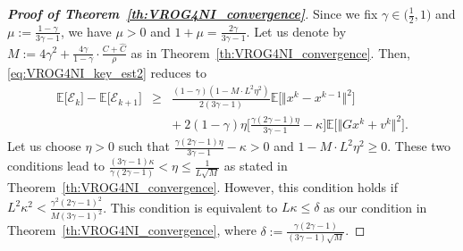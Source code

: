 \documentclass{article}
\newcommand{\norms}[1]{\Vert#1\Vert}
\newcommand{\Expk}[1]{\mathbb{E}\big[#1\big]}
\newcommand{\Ec}{\mathcal{E}}
\theoremstyle{plain}
\theoremstyle{definition}
\theoremstyle{remark}
\begin{document}
\begin{proof}[\textbf{Proof of Theorem~\ref{th:VROG4NI_convergence}}]
Since we fix $\gamma \in \big(\frac{1}{2}, 1\big)$ and $\mu := \frac{1-\gamma}{3\gamma-1}$, we have $\mu > 0$ and $1 + \mu = \frac{2\gamma}{3\gamma-1}$.
Let us denote by $M := 4\gamma^2 + \frac{ 4\gamma}{ 1-\gamma } \cdot \frac{C + \hat{C}}{\rho} $ as in Theorem~\ref{th:VROG4NI_convergence}.
Then, \eqref{eq:VROG4NI_key_est2} reduces to
\begin{equation}\label{eq:VROG4NI_key_est2_proof}
\begin{array}{lcl}
\Expk{ \Ec_k } - \Expk{ \Ec_{k+1} }  & \geq &  \frac{(1 - \gamma)(1 -  M \cdot L^2\eta^2 )}{2(3\gamma-1)} \Expk{ \norms{x^k - x^{k-1}}^2 } \\
&& + {~} 2(1-\gamma)\eta \big[  \frac{\gamma(2\gamma - 1)\eta}{3\gamma-1} - \kappa \big]  \Expk{ \norms{Gx^k + v^k}^2 }.
\end{array}
\end{equation}
Let us choose $\eta > 0$ such that $\frac{\gamma(2\gamma - 1)\eta}{3\gamma-1} - \kappa > 0$ and $1 -  M \cdot L^2\eta^2 \geq 0$.
These two conditions lead to $\frac{(3\gamma-1)\kappa}{\gamma(2\gamma-1)} < \eta \leq \frac{1}{L\sqrt{M}}$ as stated in Theorem~\ref{th:VROG4NI_convergence}. 
However, this condition holds if $L^2\kappa^2 < \frac{\gamma^2(2\gamma-1)^2}{M(3\gamma-1)^2}$.
This condition is equivalent to $L\kappa \leq \delta$ as our condition in Theorem~\ref{th:VROG4NI_convergence}, where $\delta := \frac{\gamma(2\gamma-1)}{(3\gamma-1)\sqrt{M}}$.


\end{proof}
\end{document}
